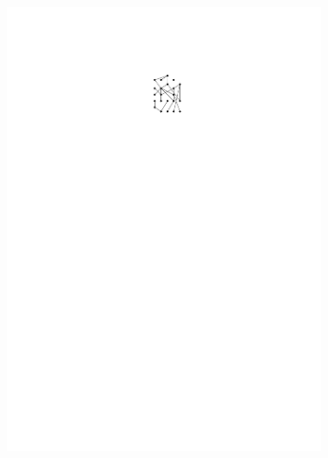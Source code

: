 \documentclass[10pt]{article}
\begin{document}
\begin{problem}
\begin{figure}[h]
\begin{subfigure}[c]{2.3cm}
        \includegraphics[width=\textwidth]{hasse2.pdf}
    \end{subfigure}
\end{figure}

\end{problem}
\end{document}
